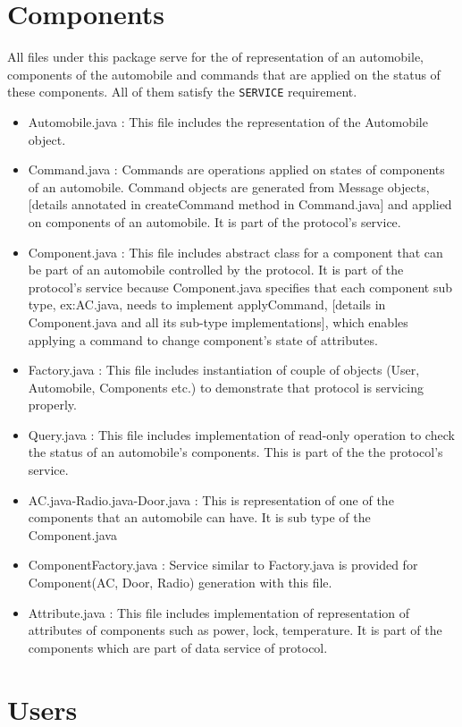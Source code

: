 \documentclass[12pt]{usenixsubmit}
\begin{document}
  \section{Components} All files under this package serve for the of representation of an automobile, components of the automobile and commands that are applied on the status of these components. All of them satisfy the {\tt SERVICE} requirement.
  \begin{itemize}
  \item Automobile.java : This file includes the representation of the Automobile object.
  \item Command.java : Commands are operations applied on states of components of an automobile. Command objects are generated from Message objects, [details annotated in \textsf{createCommand} method in Command.java] and applied on components of an automobile. It is part of the protocol's service.
  \item Component.java :  This file includes abstract class for a component that can be part of an automobile controlled by the protocol. It is part of the protocol's service because Component.java specifies that each component sub type, ex:AC.java, needs to implement \textsf{applyCommand}, [details in Component.java and all its sub-type implementations], which enables applying a command to change component's state of attributes. 
  \item Factory.java : This file includes instantiation of couple of objects (User, Automobile, Components etc.) to demonstrate that protocol is servicing properly.
  \item Query.java : This file includes implementation of read-only operation to check the status of an automobile's components. This is part of the the protocol's service.
  \item AC.java-Radio.java-Door.java  : This is representation of one of the components that an automobile can have. It is sub type of the Component.java
  \item ComponentFactory.java : Service similar to Factory.java is provided for Component(AC, Door, Radio) generation with this file.
  \item Attribute.java : This file includes implementation of representation of attributes of components such as power, lock, temperature. It is part of the components which are part of data service of protocol.
  \end{itemize}
  
  \section{Users}
\end{document}
